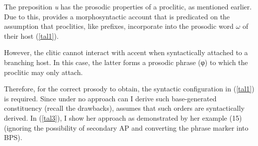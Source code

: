 \documentclass[output=paper]{langsci/langscibook}
\begin{document}
The preposition \emph{u} has the prosodic properties of a proclitic, as
mentioned earlier. Due to this, \citet{Talic:2013,Talic:2015} provides a
morphosyntactic account that is predicated on the assumption that proclitics,
like prefixes, incorporate into the prosodic word $\omega$ of their host
(\ref{tal1}).

\begin{exe}
	\ex
	 \hfill \citep[ex. 7]{Talic:2015}

\label{tal1}

\end{exe}

However, the clitic cannot interact with accent when syntactically attached  to
a  branching host. In this case, the latter forms a prosodic phrase (φ) to
which the proclitic may only attach.

\begin{exe}

	\ex
	\hfill
	 \hfill \citep[ex. 8]{Talic:2015}

\label{tal2}
\end{exe}

Therefore, for the correct prosody to obtain, the syntactic configuration in
(\ref{tal1}) is required. Since under no approach can I derive such
base-generated constituency (recall the drawbacks), \citet{Talic:2015} assumes
that such orders are syntactically derived. In (\ref{tal3}), I show her
approach as demonstrated by her example (15) (ignoring the possibility of
secondary AP and converting the phrase marker into
\gls{BPS}).
\end{document}
